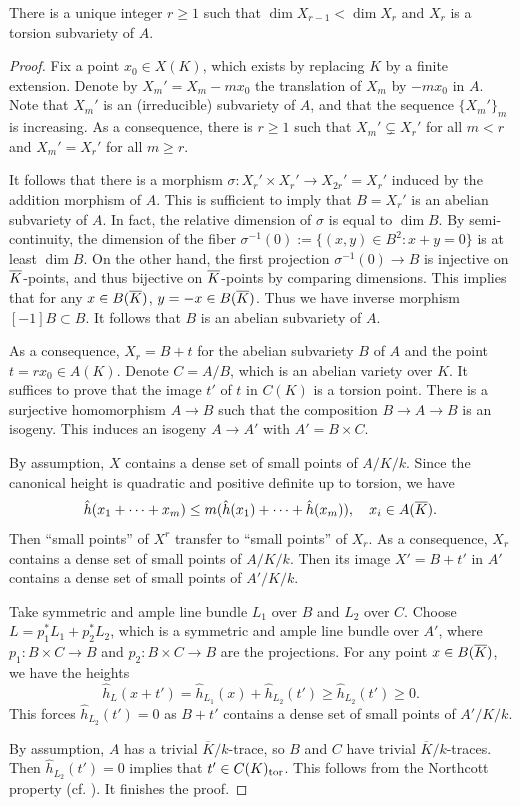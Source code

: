 \documentclass[12pt]{amsart}
\begin{document}
\begin{lem} \label{addition}
There is a unique integer $r\geq 1$ such that $\dim X_{r-1}<\dim X_r$ and $X_r$ is a torsion subvariety of $A$.
\end{lem}
\begin{proof}
Fix a point $x_0\in X(K)$, which exists by replacing $K$ by a finite extension. 
Denote by 
$X_m'=X_m-mx_0$
the translation of $X_m$ by $-mx_0$ in $A$.
Note that $X_m'$ is an (irreducible) subvariety of $A$, and that the sequence 
$\{X_m'\}_m$ is increasing. 
As a consequence, there is $r\geq 1$ such that $X_m'\subsetneq X_r'$ for all $m<r$ and $X_m'= X_r'$ for all $m\geq r$.

It follows that there is a morphism $\sigma: X_r' \times X_r' \to X_{2r}' = X_r'$ induced by the addition morphism of $A$. This is sufficient to imply that $B=X_r'$ is an abelian subvariety of $A$. 
In fact, the relative dimension of $\sigma$ is equal to $\dim B$. 
By semi-continuity, the dimension of the fiber $\sigma^{-1}(0):=\{(x,y)\in B^2:x+y=0\}$ is at least $\dim B$. 
On the other hand, the first projection $\sigma^{-1}(0)\to B$ is injective on ${\overline{K}}$-points, and thus bijective on ${\overline{K}}$-points by comparing dimensions. 
This implies that for any $x\in B({\overline{K}})$, $y=-x\in B({\overline{K}})$. 
Thus we have inverse morphism $[-1]B \subset B$. 
It follows that $B$ is an abelian subvariety of $A$. 

As a consequence, $X_r=B+t$ for the abelian subvariety $B$ of $A$ and the point $t=rx_0\in A(K)$. 
Denote $C=A/B$, which is an abelian variety over $K$.
It suffices to prove that the image $t'$ of $t$ in $C(K)$ is a torsion point.
There is a surjective homomorphism $A \to B$ such that the composition $B\to A \to B$ is an isogeny. 
This induces an isogeny $A\to A'$ with $A'=B\times C$.

By assumption, $X$ contains a dense set of small points of $A/K/k$.
Since the canonical height is quadratic and positive definite up to torsion, we have 
$$
\hat h(x_1+ \cdots+ x_m)\leq  m(\hat h(x_1)+ \cdots +\hat h(x_m)), \quad x_i\in A({\overline{K}}).
$$
Then ``small points'' of $X^r$ transfer to ``small points'' of $X_r$.
As a consequence, $X_r$ contains a dense set of small points of $A/K/k$.
Then its image $X'=B+t'$ in $A'$ contains a dense set of small points of $A'/K/k$.

Take symmetric and ample line bundle $L_1$ over $B$ and $L_2$ over $C$.
Choose $L=p_1^*L_1+p_2^*L_2$, which is a symmetric and ample line bundle over $A'$, where $p_1:B\times C\to B$ and $p_2:B\times C\to B$ are the projections. 
For any point $x\in B({\overline{K}})$, we have the heights
$$
\hat h_L(x+t')= \hat h_{L_1}(x)+\hat h_{L_2}(t') \geq \hat h_{L_2}(t') \geq 0. 
$$
This forces $\hat h_{L_2}(t')=0$ as $B+t'$ contains a dense set of small points of $A'/K/k$.

By assumption, $A$ has a trivial $\overline K/ k$-trace, so 
$B$ and $C$ have trivial $\overline K/ k$-traces.
Then $\hat h_{L_2}(t')=0$ implies that $t'\in C(K)_{\mathrm{tor}}$. 
This follows from the Northcott property (cf. \cite[Theorem 9.15]{Conrad}).
It finishes the proof.
\end{proof}
\end{document}
